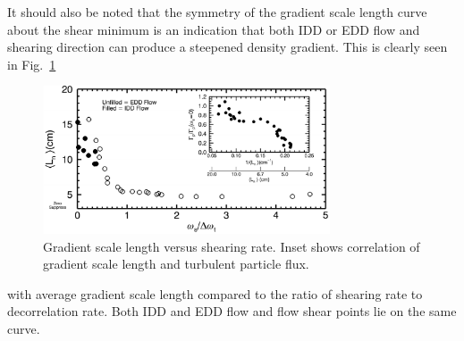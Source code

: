 \documentclass[%
 aps,
 prl,
 amsmath,amssymb,
 reprint,%
]{revtex4-1}
\begin{document}
It should also be noted that the symmetry of the gradient scale length curve about the shear minimum is an indication that both IDD or EDD flow and shearing direction can produce a steepened density gradient. This is clearly seen in
Fig.~\ref{fig:shearandgrad}
\begin{figure}
\begin{center}
\includegraphics[width=8.5cm]{shearandgrad.pdf}%
\end{center}
\caption{\label{fig:shearandgrad} Gradient scale length versus shearing rate. Inset shows correlation of gradient scale length and turbulent particle flux.}
\end{figure}
with average gradient scale length compared to the ratio of shearing rate to decorrelation rate. Both IDD and EDD flow and flow shear points lie on the same curve.
\end{document}

